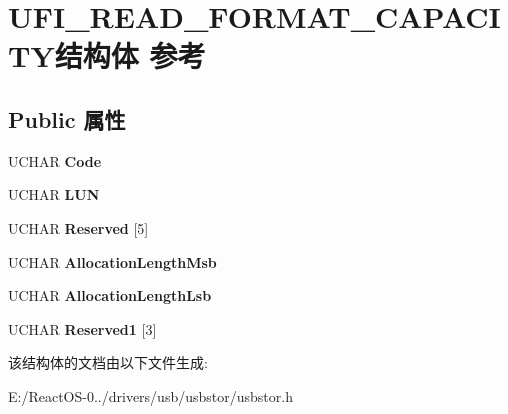 \hypertarget{struct_u_f_i___r_e_a_d___f_o_r_m_a_t___c_a_p_a_c_i_t_y}{}\section{U\+F\+I\+\_\+\+R\+E\+A\+D\+\_\+\+F\+O\+R\+M\+A\+T\+\_\+\+C\+A\+P\+A\+C\+I\+T\+Y结构体 参考}
\label{struct_u_f_i___r_e_a_d___f_o_r_m_a_t___c_a_p_a_c_i_t_y}
\subsection*{Public 属性}
\begin{DoxyCompactItemize}
\item 
\mbox{\label{struct_u_f_i___r_e_a_d___f_o_r_m_a_t___c_a_p_a_c_i_t_y_a425d23f5648e87e7cdc47fc6f943eabc}} 
U\+C\+H\+AR {\bfseries Code}
\item 
\mbox{\label{struct_u_f_i___r_e_a_d___f_o_r_m_a_t___c_a_p_a_c_i_t_y_acc7cfa8ca942852f8a623479856c260a}} 
U\+C\+H\+AR {\bfseries L\+UN}
\item 
\mbox{\label{struct_u_f_i___r_e_a_d___f_o_r_m_a_t___c_a_p_a_c_i_t_y_af41674301a4bdc7c2fbc074f1081c1a8}} 
U\+C\+H\+AR {\bfseries Reserved} \mbox{[}5\mbox{]}
\item 
\mbox{\label{struct_u_f_i___r_e_a_d___f_o_r_m_a_t___c_a_p_a_c_i_t_y_a0374aa497f1ff31860091877d51ca1d6}} 
U\+C\+H\+AR {\bfseries Allocation\+Length\+Msb}
\item 
\mbox{\label{struct_u_f_i___r_e_a_d___f_o_r_m_a_t___c_a_p_a_c_i_t_y_ae4fb13b598c786fbc3290cef007917ca}} 
U\+C\+H\+AR {\bfseries Allocation\+Length\+Lsb}
\item 
\mbox{\label{struct_u_f_i___r_e_a_d___f_o_r_m_a_t___c_a_p_a_c_i_t_y_a2175b2b60ddee9f13f0968d7927a733e}} 
U\+C\+H\+AR {\bfseries Reserved1} \mbox{[}3\mbox{]}
\end{DoxyCompactItemize}


该结构体的文档由以下文件生成\+:\begin{DoxyCompactItemize}
\item 
E\+:/\+React\+O\+S-\/0../drivers/usb/usbstor/usbstor.\+h\end{DoxyCompactItemize}
